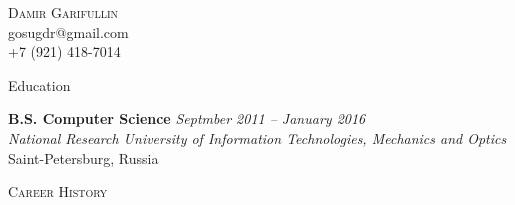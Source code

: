 \documentclass[12pt]{article}
\newenvironment{changemargin}[2]{%
  \begin{list}{}{%
    \setlength{\topsep}{0pt}%
    \setlength{\leftmargin}{#1}%
    \setlength{\rightmargin}{#2}%
    \setlength{\listparindent}{\parindent}%
    \setlength{\itemindent}{\parindent}%
    \setlength{\parsep}{\parskip}%
  }%
  \item[]}{\end{list}
}
\newcommand{\lineover}{
	\begin{changemargin}{-0.05in}{-0.05in}
		\vspace*{-8pt}
		\hrulefill \\
		\vspace*{-2pt}
	\end{changemargin}
}
\newcommand{\header}[1]{
	\begin{changemargin}{-0.5in}{-0.5in}
		\scshape{#1}\\
  	\lineover
	\end{changemargin}
}
\newcommand{\contact}[4]{
	\begin{changemargin}{-0.5in}{-0.5in}
		\begin{center}
			{\Large \scshape {#1}}\\ \smallskip
			{#2}\\ \smallskip 
			{#3}\\ \smallskip
			{#4}\smallskip
		\end{center}
	\end{changemargin}
}
\newenvironment{body} {
	\vspace*{-16pt}
	\begin{changemargin}{-0.25in}{-0.5in}
  }	
	{\end{changemargin}
}
\begin{document}
\contact{Damir Garifullin}{gosugdr@gmail.com}{+7 (921) 418-7014}

\header{Education}

\begin{body}
	\vspace{14pt}
	\textbf{B.S. Computer Science} \hfill \emph{Septmber 2011 -- January 2016} \\
	\smallskip
	\emph{National Research University of Information Technologies, Mechanics and Optics} Saint-Petersburg, Russia\\
\end{body}

\smallskip


\header{Career History}
\end{document}
